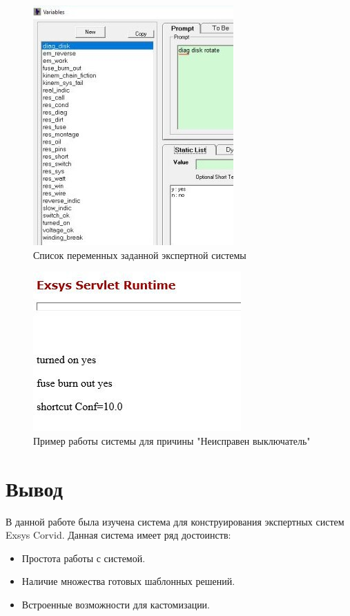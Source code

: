 \documentclass[14pt,a4paper,report]{report}
\begin{document}
\begin{figure}[h!]
	\centering
	\includegraphics[scale = 1.35]{images/2.jpg}
	\caption{Список переменных заданной экспертной системы}
\end{figure}

\clearpage

\begin{figure}[h!]
	\centering
	\includegraphics[scale = 0.7]{images/7_1.png}
	\caption{Пример работы системы для причины "Неисправен выключатель"}
\end{figure}


\section{Вывод}

В данной работе была изучена система для конструирования экспертных систем Exsys Corvid. Данная система имеет ряд достоинств:

\begin{itemize}
	\item Простота работы с системой.
	\item Наличие множества готовых шаблонных решений.
	\item Встроенные возможности для кастомизации.
\end{itemize}
\end{document}
